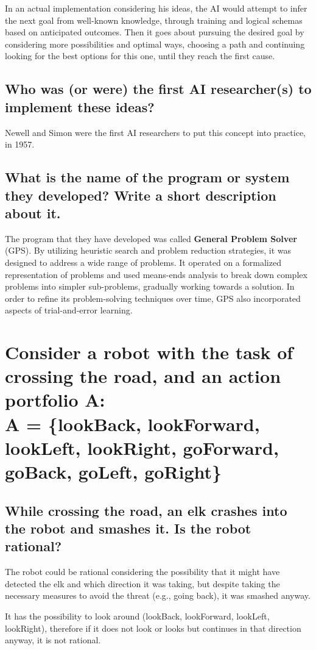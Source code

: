 \documentclass{article}
\begin{document}
In an actual implementation considering his ideas, the AI would attempt to infer the next goal from well-known knowledge, through training and logical schemas based on anticipated outcomes.
Then it goes about pursuing the desired goal by considering more possibilities and optimal ways, choosing a path and continuing looking for the best options for this one, until they reach the first cause.

\subsection{Who was (or were) the first AI researcher(s) to implement these ideas?}
Newell and Simon were the first AI researchers to put this concept into practice, in 1957.

\subsection{What is the name of the program or system they developed? Write a short description about
it.}
The program that they have developed was called \textbf{General Problem Solver} (GPS).
By utilizing heuristic search and problem reduction strategies, it was designed to address a wide range of problems.
It operated on a formalized representation of problems and used means-ends analysis to break down complex problems into simpler sub-problems, gradually working towards a solution.
In order to refine its problem-solving techniques over time, GPS also incorporated aspects of trial-and-error learning.


\section{Consider a robot with the task of crossing the road, and an action portfolio A: \\
A = \{lookBack, lookForward, lookLeft, lookRight, goForward, goBack, goLeft, goRight\}}

\subsection{While crossing the road, an elk crashes into the robot and smashes it. Is the robot rational?}
The robot could be rational considering the possibility that it might have detected the elk and which direction it was taking, but despite taking the necessary measures to avoid the threat (e.g., going back), it was smashed anyway.

It has the possibility to look around (lookBack, lookForward, lookLeft, lookRight), therefore if it does not look or looks but continues in that direction anyway, it is not rational.
\end{document}

